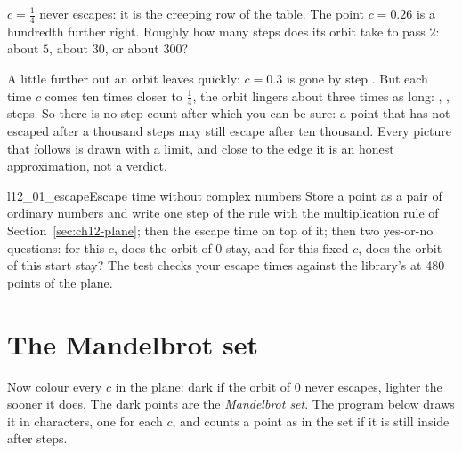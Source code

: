 \begin{think}
$c = \tfrac14$ never escapes: it is the creeping row of the table. The point
$c = \num{0.26}$ is a hundredth further right. Roughly how many steps does
its orbit take to pass $2$: about $5$, about $30$, or about $300$?
\end{think}



\noindent
A little further out an orbit leaves quickly: $c = \num{0.3}$ is gone by
step . But each time $c$ comes ten times closer to
$\tfrac14$, the orbit lingers about
three times as long: , ,
 steps. So there is no step count after which you can
be sure: a point that has not escaped after a thousand steps may still
escape after ten thousand. Every picture that follows is drawn with a
limit, and close to the edge it is an honest approximation, not a verdict.

\begin{lab}{l12_01_escape}{Escape time without complex numbers}
Store a point as a pair of ordinary numbers and write one step of the rule
with the multiplication rule of Section~\ref{sec:ch12-plane}; then the
escape time on top of it; then two yes-or-no questions: for this $c$, does
the orbit of $0$ stay, and for this fixed $c$, does the orbit of this start
stay? The test checks your escape times against the library's at 480
points of the plane.
\end{lab}

\section{The Mandelbrot set}
\label{sec:ch12-mset}

\noindent
Now colour every $c$ in the plane: dark if the orbit of $0$ never escapes,
lighter the sooner it does. The dark points are the \emph{Mandelbrot set}.
The program below draws it in characters, one for each $c$, and counts a
point as in the set if it is still inside after 
steps.


